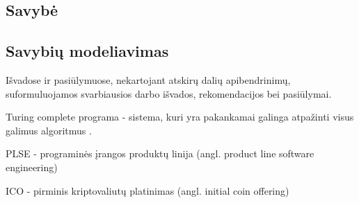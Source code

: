 \documentclass{VUMIFPSkursinis}
\begin{document}
\subsection{Savybė}
\subsection{Savybių modeliavimas}





Išvadose ir pasiūlymuose, nekartojant atskirų dalių apibendrinimų,
suformuluojamos svarbiausios darbo išvados, rekomendacijos bei pasiūlymai.



\printbibliography[heading=bibintoc] %

Turing complete programa - sistema, kuri yra pakankamai galinga atpažinti visus galimus algoritmus \cite{Teller1994}. 

PLSE - programinės įrangos produktų linija (angl. product line software engineering)

ICO - pirminis kriptovaliutų platinimas (angl. initial coin offering)

%
\end{document}
